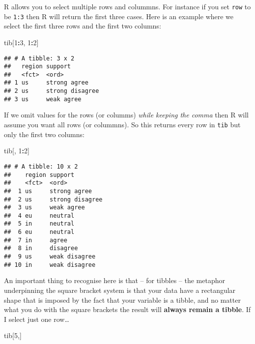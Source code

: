 \documentclass[]{book}
\newenvironment{Shaded}{\begin{snugshade}}{\end{snugshade}}
\newcommand{\DecValTok}[1]{\textcolor[rgb]{0.00,0.00,0.81}{#1}}
\newcommand{\NormalTok}[1]{#1}
\newcommand{\OperatorTok}[1]{\textcolor[rgb]{0.81,0.36,0.00}{\textbf{#1}}}
\begin{document}
R allows you to select multiple rows and colummns. For instance if you set \texttt{row} to be \texttt{1:3} then R will return the first three cases. Here is an example where we select the first three rows and the first two columns:

\begin{Shaded}
\begin{Highlighting}[]
\NormalTok{tib[}\DecValTok{1}\OperatorTok{:}\DecValTok{3}\NormalTok{, }\DecValTok{1}\OperatorTok{:}\DecValTok{2}\NormalTok{]}
\end{Highlighting}
\end{Shaded}

\begin{verbatim}
## # A tibble: 3 x 2
##   region support        
##   <fct>  <ord>          
## 1 us     strong agree   
## 2 us     strong disagree
## 3 us     weak agree
\end{verbatim}

If we omit values for the rows (or columms) \emph{while keeping the comma} then R will assume you want all rows (or colummns). So this returns every row in \texttt{tib} but only the first two columns:

\begin{Shaded}
\begin{Highlighting}[]
\NormalTok{tib[, }\DecValTok{1}\OperatorTok{:}\DecValTok{2}\NormalTok{]}
\end{Highlighting}
\end{Shaded}

\begin{verbatim}
## # A tibble: 10 x 2
##    region support        
##    <fct>  <ord>          
##  1 us     strong agree   
##  2 us     strong disagree
##  3 us     weak agree     
##  4 eu     neutral        
##  5 in     neutral        
##  6 eu     neutral        
##  7 in     agree          
##  8 in     disagree       
##  9 us     weak disagree  
## 10 in     weak disagree
\end{verbatim}

An important thing to recognise here is that -- for tibbles -- the metaphor underpinning the square bracket system is that your data have a rectangular shape that is imposed by the fact that your variable is a tibble, and no matter what you do with the square brackets the result will \textbf{always remain a tibble}. If I select just one row\ldots{}

\begin{Shaded}
\begin{Highlighting}[]
\NormalTok{tib[}\DecValTok{5}\NormalTok{,]}
\end{Highlighting}
\end{Shaded}
\end{document}
